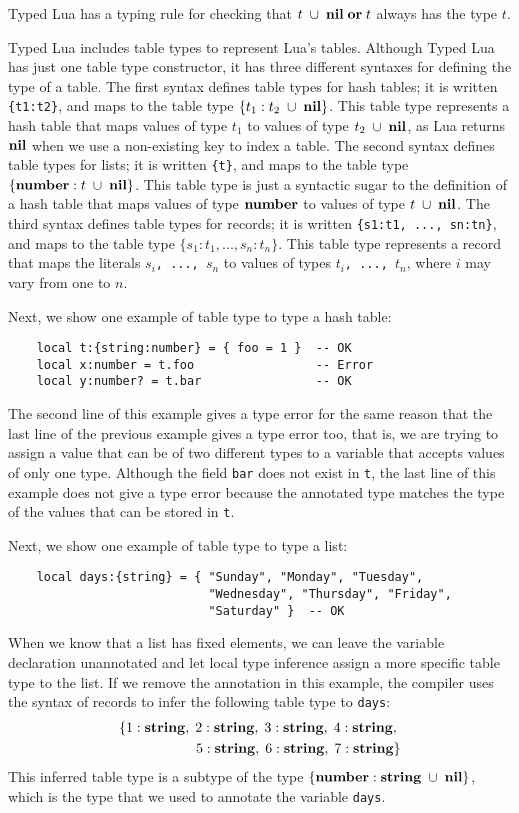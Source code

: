 Typed Lua has a typing rule for checking that
$t\;\cup\;\mathbf{nil}\;\mathbf{or}\;t$ always has the type $t$.

Typed Lua includes table types to represent Lua's tables.
Although Typed Lua has just one table type constructor, it has three
different syntaxes for defining the type of a table.
The first syntax defines table types for hash tables;
it is written \texttt{\{t1:t2\}},
and maps to the table type $\{t_{1}:t_{2}\;\cup\;\mathbf{nil}\}$.
This table type represents a hash table that maps values of type
$t_{1}$ to values of type $t_{2}\;\cup\;\mathbf{nil}$, as Lua returns
$\mathbf{nil}$ when we use a non-existing key to index a table.
The second syntax defines table types for lists;
it is written \texttt{\{t\}},
and maps to the table type $\{\mathbf{number}:t\;\cup\;\mathbf{nil}\}$.
This table type is just a syntactic sugar to the definition of a
hash table that maps values of type $\mathbf{number}$ to values of type
$t\;\cup\;\mathbf{nil}$.
The third syntax defines table types for records;
it is written \texttt{\{s1:t1, ..., sn:tn\}},
and maps to the table type $\{s_{1}:t_{1}, ..., s_{n}:t_{n}\}$.
This table type represents a record that maps the literals
$s_{i}$\texttt{, ..., }$s_{n}$ to values of types
$t_{i}$\texttt{, ..., }$t_{n}$, where $i$ may vary from one to $n$.

Next, we show one example of table type to type a hash table:
\begin{verbatim}
    local t:{string:number} = { foo = 1 }  -- OK
    local x:number = t.foo                 -- Error
    local y:number? = t.bar                -- OK
\end{verbatim}

The second line of this example gives a type error for the same
reason that the last line of the previous example gives a type error
too, that is, we are trying to assign a value that can be of two
different types to a variable that accepts values of only one type.
Although the field \texttt{bar} does not exist in \texttt{t}, the last
line of this example does not give a type error because the
annotated type matches the type of the values that can be stored in
\texttt{t}.

Next, we show one example of table type to type a list:
\begin{verbatim}
    local days:{string} = { "Sunday", "Monday", "Tuesday",
                            "Wednesday", "Thursday", "Friday",
                            "Saturday" }  -- OK
\end{verbatim}

When we know that a list has fixed elements, we can leave the
variable declaration unannotated and let local type inference assign
a more specific table type to the list.
If we remove the annotation in this example, the compiler uses the
syntax of records to infer the following table type to \texttt{days}:
\begin{align*}
\{{1:\mathbf{string}},\;{2:\mathbf{string}},\;{3:\mathbf{string}},\;{4:\mathbf{string}},\;\\
{5:\mathbf{string}},\;{6:\mathbf{string}},\;{7:\mathbf{string}}\}
\end{align*}
This inferred table type is a subtype of the type
$\{\mathbf{number}:\mathbf{string}\;\cup\;\mathbf{nil}\}$, which is the type that we used to
annotate the variable \texttt{days}.

